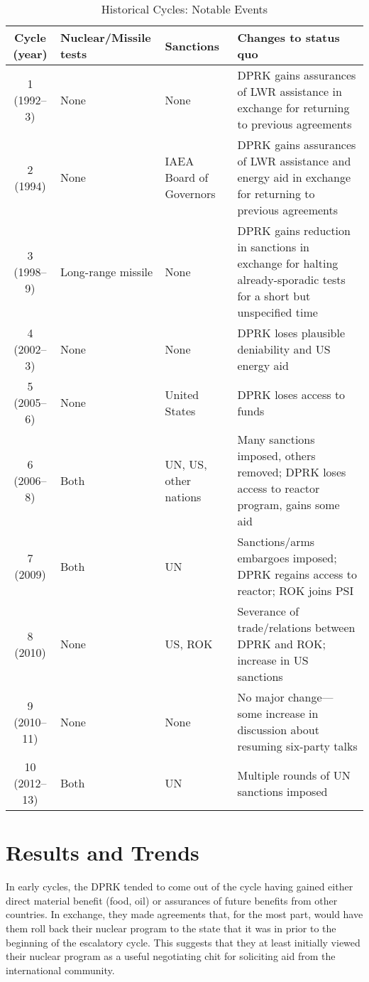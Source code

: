 \begin{table}[H]
	\caption{Historical Cycles: Notable Events} 
	\small
	\begin{tabular}{|c|p{3cm}|p{2.25cm}|p{6.5cm}|}
	\hline
	Cycle (year) & Nuclear/Missile tests & Sanctions & Changes to status quo \\ 
	\hline
	1 (1992--3) & None & None & DPRK gains assurances of LWR assistance in exchange for returning to previous agreements \\ 
	\hline
	2 (1994) & None & IAEA Board of Governors & DPRK gains assurances of LWR assistance and energy aid in exchange for returning to previous agreements \\ 
	\hline
	3 (1998--9) & Long-range missile & None & DPRK gains reduction in sanctions in exchange for halting already-sporadic tests for a short but unspecified time \\ 
	\hline
	4 (2002--3) & None & None & DPRK loses plausible deniability and US energy aid \\ 
	\hline
	5 (2005--6) & None & United States & DPRK loses access to funds\\ 
	\hline
	6 (2006--8) & Both & UN, US, other nations & Many sanctions imposed, others removed; DPRK loses access to reactor program, gains some aid \\ 
	\hline
	7 (2009) & Both & UN & Sanctions/arms embargoes imposed; DPRK regains access to reactor; ROK joins PSI \\ 
	\hline
	8 (2010) & None & US, ROK & Severance of trade/relations between DPRK and ROK; increase in US sanctions \\ 
	\hline
	9 (2010--11) & None & None & No major change---some increase in discussion about resuming six-party talks \\ 
	\hline
	10 (2012--13) & Both & UN & Multiple rounds of UN sanctions imposed \\
	\hline
	\end{tabular} 
\end{table}

\section{Results and Trends}

In early cycles, the DPRK tended to come out of the cycle having gained either direct material benefit (food, oil) or assurances of future benefits from other countries. In exchange, they made agreements that, for the most part, would have them roll back their nuclear program to the state that it was in prior to the beginning of the escalatory cycle. This suggests that they at least initially viewed their nuclear program as a useful negotiating chit for soliciting aid from the international community.

